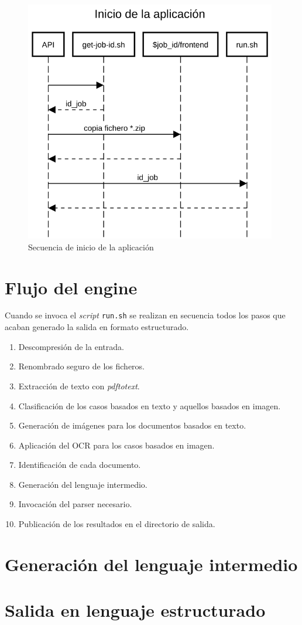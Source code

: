 \begin{figure}[hp!]
  \centering
  \includegraphics[width=11cm]{imaxes/inicio-aplicacion.png}
  \caption{Secuencia de inicio de la aplicación}
  \label{fig:inicio-aplicacion}
\end{figure}


\section{Flujo del engine}

Cuando se invoca el \emph{script} \verb|run.sh| se realizan en secuencia todos los pasos que acaban generado la salida en formato estructurado. 

\begin{enumerate}
    \item Descompresión de la entrada.
    \item Renombrado seguro de los ficheros.
    \item Extracción de texto con \emph{pdftotext}.
    \item Clasificación de los casos basados en texto y aquellos basados en imagen.
    \item Generación de imágenes para los documentos basados en texto.
    \item Aplicación del OCR para los casos basados en imagen.
    \item Identificación de cada documento.
    \item Generación del lenguaje intermedio.
    \item Invocación del parser necesario.
    \item Publicación de los resultados en el directorio de salida.
\end{enumerate}

\section{Generación del lenguaje intermedio}
\section{Salida en lenguaje estructurado}